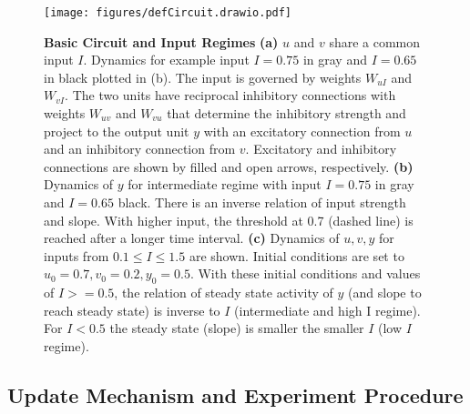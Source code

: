 \documentclass[9pt]{article}
\begin{document}
\begin{figure}[h]
	\centering
	\texttt{[image: figures/defCircuit.drawio.pdf]}
	\caption{\textbf{Basic Circuit and Input Regimes} 
	\textbf{(a)} $u$ and $v$ share a common input $I$. Dynamics for example input $I=0.75$ in gray and $I=0.65$ in black plotted in (b). The input is governed by weights $W_{uI}$ and $W_{vI}$. The two units have reciprocal inhibitory connections with weights $W_{uv}$ and $W_{vu}$ that determine the inhibitory strength and project to the output unit $y$ with an excitatory connection from $u$ and an inhibitory connection from $v$. Excitatory and inhibitory connections are shown by filled and open arrows, respectively. 
	\textbf{(b)} Dynamics of $y$ for intermediate regime with input $I=0.75$ in gray and $I=0.65$ black. There is an inverse relation of input strength and slope. With higher input, the threshold at 0.7 (dashed line) is reached after a longer time interval. 
	\textbf{(c)} Dynamics of $u, v, y$ for inputs from $0.1\leq I \leq 1.5$ are shown. Initial conditions are set to $u_0=0.7 , v_0=0.2 , y_0=0.5$. With these initial conditions and values of $I>=0.5$, the relation of steady state activity of $y$ (and slope to reach steady state) is inverse to $I$ (intermediate and high I regime). For $I<0.5$ the steady state (slope) is smaller the smaller $I$ (low $I$ regime).}
\label{fig:circuit}
\end{figure}


\subsection{Update Mechanism and Experiment Procedure}
\end{document}
